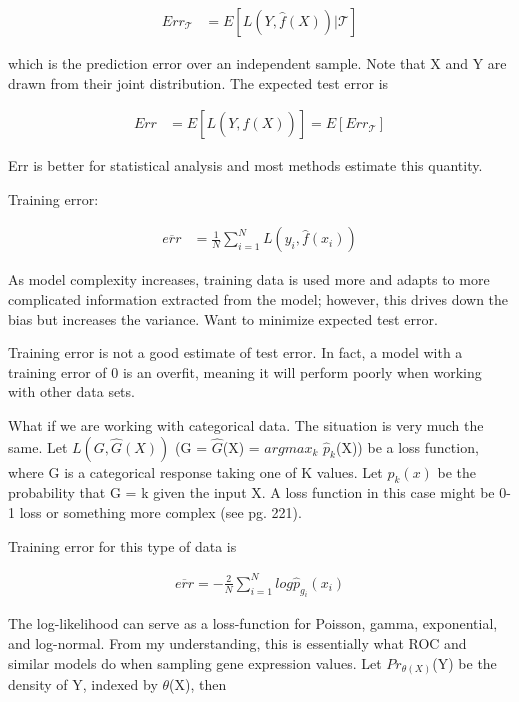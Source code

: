 \documentclass[11pt]{labbook}
\newcommand{\Loss}[2]{L\left(#1,#2\right)}
\begin{document}
\begin{align*}
Err_\mathcal{T} &= E\left[L\left(Y,\hat{f}(X)\right)|\mathcal{T}\right]
\end{align*}

which is the prediction error over an independent sample. Note that X and Y are drawn from their joint distribution. The expected test error is 

\begin{align*}
Err &= E\left[L\left(Y,\hat{f}(X)\right)\right] = E\left[Err_\mathcal{T}\right]
\end{align*}

Err is better for statistical analysis and most methods estimate this quantity. 
\newline

Training error:

\begin{align*}
\overline{err} &= \frac{1}{N}\sum_{i=1}^{N}\Loss{y_i}{\hat{f}(x_i)}
\end{align*}


As model complexity increases, training data is used more and adapts to more complicated information extracted from the model; however, this drives down the bias but increases the variance. Want to minimize expected test error. 

Training error is not a good estimate of test error. In fact, a model with a training error of 0 is an overfit, meaning it will perform poorly when working with other data sets. 

What if we are working with categorical data. The situation is very much the same. Let $\Loss{G}{\hat{G}(X)}$ (G = $\hat{G}$(X) = $argmax_k$ $\hat{p}_k$(X)) be a loss function, where G is a categorical response taking one of K values. Let $p_k(x)$ be the probability that G = k given the input X. A loss function in this case might be 0-1 loss or something more complex (see pg. 221).

Training error for this type of data is 

\begin{align*}
\overline{err} = -\frac{2}{N}\sum_{i=1}^{N}log\hat{p}_{g_i}(x_i)
\end{align*}

The log-likelihood can serve as a loss-function for Poisson, gamma, exponential, and log-normal. From my understanding, this is essentially what ROC and similar models do when sampling gene expression values. Let $Pr_{\theta\left(X\right)}$(Y) be the density of Y, indexed by $\theta$(X), then
\end{document}

